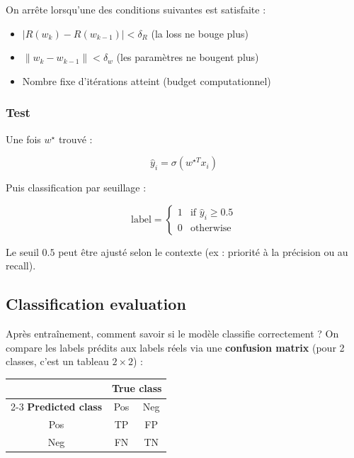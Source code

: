 \documentclass[11pt,a4paper,openany]{book}
\begin{document}
\begin{rembox}[title=Convergence criteria]
On arrête lorsqu'une des conditions suivantes est satisfaite :
\begin{itemize}
    \item $|R(w_k) - R(w_{k-1})| < \delta_R$ \quad (la loss ne bouge plus)
    \item $\|w_k - w_{k-1}\| < \delta_w$ \quad (les paramètres ne bougent plus)
    \item Nombre fixe d'itérations atteint (budget computationnel)
\end{itemize}
\end{rembox}

\vspace{0.8cm}

\subsubsection{Test}

Une fois $w^\star$ trouvé :

\[
\hat{y}_i = \sigma(w^{\star T} x_i)
\]

Puis classification par seuillage :

\[
\text{label} =
\begin{cases}
1 & \text{if } \hat{y}_i \geq 0.5 \\
0 & \text{otherwise}
\end{cases}
\]

Le seuil $0.5$ peut être ajusté selon le contexte (ex : priorité à la précision ou au recall).
\vspace{8cm}

\subsection{Classification evaluation}

Après entraînement, comment savoir si le modèle classifie correctement ?
On compare les labels prédits aux labels réels via une \textbf{confusion matrix} (pour 2 classes, c'est un tableau $2\times 2$) :

\vspace{0.4cm}

\begin{center}
\renewcommand{\arraystretch}{1.6}
\setlength{\tabcolsep}{12pt}

\begin{tabular}{c|c|c}
\multicolumn{1}{c}{} & \multicolumn{2}{c}{\textbf{True class}} \\
\cline{2-3}
\textbf{Predicted class} & Pos & Neg \\
\hline
Pos & TP & FP \\
Neg & FN & TN \\
\end{tabular}
\end{center}
\end{document}
